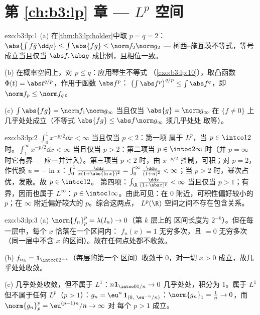 \section*{第 \ref{ch:b3:lp} 章 --- $L^p$ 空间}

\begin{solution}{exo:b3:lp:1}
(a) 在\cref{thm:b3:lp:holder}中取 $p = q = 2$：$\abs{\int f\bar
g\,\dd\mu} \leq \int\abs{fg} \leq \norm f_2\norm g_2$ ---
柯西--施瓦茨不等式，等号成立当且仅当 $\abs f, \abs g$
成比例，且相位一致。

(b) 在概率空间上，对 $p \leq q$：应用琴生不等式
（\cref{exo:b3:lp:10}），取凸函数 $\Phi(t) =
\abs t^{q/p}$，作用于函数 $\abs f^p$：
$\bigl(\int\abs f^p\bigr)^{q/p} \leq \int\abs f^q$，即
$\norm f_p \leq \norm f_q$。

(c) $\int\abs{fg} = \norm f_1\norm g_\infty$ 当且仅当 $\abs{g} =
\norm g_\infty$ 在 $\{f \neq 0\}$ 上几乎处处成立（不等式
$\abs{fg} \leq \abs f\norm g_\infty$ 须几乎处处
取等）。
\end{solution}

\begin{solution}{exo:b3:lp:2}
$\int_0^1 x^{-p/2}\dd x < \infty$ 当且仅当 $p < 2$：第一项
属于 $L^p$，当 $p \in \intco12$ 时。$\int_1^\infty x^{-p/2}\dd x <
\infty$ 当且仅当 $p > 2$：第二项当 $p \in \intoo2\infty$ 时（并
$p = \infty$ 时它有界 --- 应一并计入）。第三项当 $p <
2$ 时，由 $x^{-p/2}$ 控制，可积；对 $p = 2$，
作代换 $u = -\ln x$：$\int_0^1\frac{\dd x}{x(1 + \abs{\ln
x})^2} = \int_0^\infty\frac{\dd u}{(1 + u)^2} < \infty$；当
$p > 2$ 时，幂次占优，发散。故 $p \in \intcc12$。
第四项：$\int_\R\frac{\dd x}{(1 + \abs x)^p} < \infty$ 当且仅当 $p >
1$；有界，因而也属于 $L^\infty$：$p \in
\intoc1\infty$。由此可见：在 $0$ 附近，可积性偏好较小的 $p$；在
$\infty$ 附近偏好较大的 $p$。综合这两点，
$L^p(\R)$ 空间之间不存在包含关系。
\end{solution}

\begin{solution}{exo:b3:lp:3}
(a) $\norm{f_n}_p^p = \lambda(I_n) \to 0$（第 $k$ 层上的
区间长度为 $2^{-k}$）。但在每一层中，每个 $x$ 恰落在一个区间内：
$f_n(x) = 1$ 无穷多次，且 $= 0$
无穷多次（同一层中不含
$x$ 的区间）。故在任何点处都不收敛。

(b) $f_{n_k} = \mathbf 1_{\intcc0{2^{-k}}}$（每层的第一个
区间）收敛于 $0$，对一切 $x > 0$ 成立，故几乎处处收敛。

(c) 几乎处处收敛，但不属于 $L^1$：$n\mathbf 1_{\intoo0{1/n}} \to 0$
几乎处处，积分为 $1$。属于 $L^1$ 但不属于任何 $L^p$（$p > 1$）：$g_n =
\eu^n\,\mathbf 1_{(0,\ \eu^{-n}/n)}$：$\norm{g_n}_1 = \frac1n
\to 0$，而 $\norm{g_n}_p^p = \eu^{(p-1)n}/n \to \infty$ 对
每个 $p > 1$ 成立。
\end{solution}

